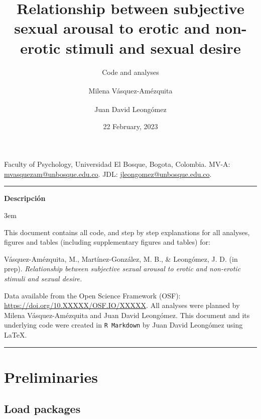 \documentclass[
  bookmarksnumbered]{article}
\title{Relationship between subjective sexual arousal to erotic and non-erotic stimuli and sexual desire}
\subtitle{Code and analyses}
\author{Milena Vásquez-Amézquita \orcidlink{0000-0001-7317-8430}\textsuperscript{} \and Juan David Leongómez \orcidlink{0000-0002-0092-6298}\textsuperscript{}}
\date{22 February, 2023}
\begin{document}
\maketitle

\begin{center}
Faculty of Psychology, Universidad El Bosque, Bogota, Colombia. \linebreak
MV-A: \href{mailto:mvasquezam@unbosque.edu.co}{mvasquezam@unbosque.edu.co}. 
JDL: \href{mailto:jleongomez@unbosque.edu.co}{jleongomez@unbosque.edu.co}.

\begin{center}\rule{0.5\linewidth}{0.5pt}\end{center}

\textbf{Descripción}
\end{center}

\par
\begingroup
\leftskip3em
\rightskip\leftskip

This document contains all code, and step by step explanations for all analyses, figures and tables (including supplementary figures and tables) for:

\begin{hangparas}{.25in}{1}
Vásquez-Amézquita, M., Martínez-González, M. B., \& Leongómez, J. D. (in prep). \textit{Relationship between subjective sexual arousal to erotic and non-erotic stimuli and sexual desire.}
\end{hangparas}

Data available from the Open Science Framework (OSF): \url{https://doi.org/10.XXXXX/OSF.IO/XXXXX}. All analyses were planned by Milena Vásquez-Amézquita and Juan David Leongómez. This document and its underlying code were created in \texttt{R\ Markdown} by Juan David Leongómez using \LaTeX.

\begin{center}\rule{0.5\linewidth}{0.5pt}\end{center}

\par
\endgroup

{\hypersetup{hidelinks}
\setcounter{tocdepth}{6}
\tableofcontents
}
\opensupplement

\newpage

\hypertarget{preliminaries}{%
\section{Preliminaries}\label{preliminaries}}

\hypertarget{load-packages}{%
\subsection{Load packages}\label{load-packages}}
\end{document}
